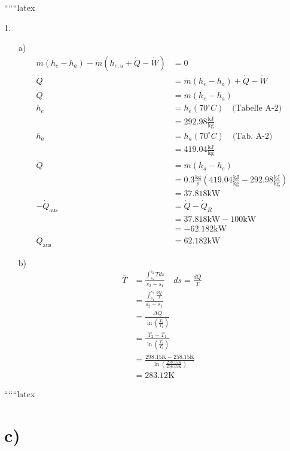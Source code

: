 
``````latex


1. 
\begin{itemize}
    \item[a)]
    \begin{align*}
        \dot{m} (h_e - h_a) - \dot{m} (h_{e,u} + \dot{Q} - \dot{W}) &= 0 \\
        \dot{Q} &= \dot{m} (h_e - h_a) + \dot{Q} - \dot{W} \\
        \dot{Q} &= \dot{m} (h_e - h_a) \\
        h_e &= h_e (70^\circ C) \quad \text{(Tabelle A-2)} \\
        &= 292.98 \frac{\text{kJ}}{\text{kg}} \\
        h_a &= h_a (70^\circ C) \quad \text{(Tab. A-2)} \\
        &= 419.04 \frac{\text{kJ}}{\text{kg}} \\
        \dot{Q} &= \dot{m} (h_a - h_e) \\
        &= 0.3 \frac{\text{kg}}{\text{s}} (419.04 \frac{\text{kJ}}{\text{kg}} - 292.98 \frac{\text{kJ}}{\text{kg}}) \\
        &= 37.818 \text{kW} \\
        -\dot{Q}_{\text{aus}} &= \dot{Q} - \dot{Q}_R \\
        &= 37.818 \text{kW} - 100 \text{kW} \\
        &= -62.182 \text{kW} \\
        \dot{Q}_{\text{aus}} &= 62.182 \text{kW}
    \end{align*}
    
    \item[b)]
    \begin{align*}
        \overline{T} &= \frac{\int_{s_1}^{s_2} T ds}{s_2 - s_1} \quad ds = \frac{dQ}{T} \\
        &= \frac{\int_{s_1}^{s_2} \frac{dQ}{T}}{s_2 - s_1} \\
        &= \frac{\Delta Q}{\ln \left( \frac{T_2}{T_1} \right)} \\
        &= \frac{T_2 - T_1}{\ln \left( \frac{T_2}{T_1} \right)} \\
        &= \frac{298.15 \text{K} - 258.15 \text{K}}{\ln \left( \frac{298.15 \text{K}}{258.15 \text{K}} \right)} \\
        &= 283.12 \text{K}
    \end{align*}
\end{itemize}

``````latex


\section*{c)}

